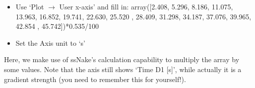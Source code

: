 \documentclass[11pt,a4paper]{article}
\begin{document}
\begin{itemize}
  \item Use `Plot $\longrightarrow$ User x-axis' and fill in: array([2.408, 5.296, 8.186, 11.075, 13.963, 16.852, 19.741, 22.630,
25.520 , 28.409, 31.298, 34.187, 37.076, 39.965, 42.854 , 45.742])*0.535/100 
\item Set the Axis unit to `s'
\end{itemize}
Here, we make use of ssNake's calculation capability to multiply the array by some values. Note that
the axis still shows `Time D1 [s]', while actually it is a gradient strength (you need to remember
this for yourself!).
\end{document}
